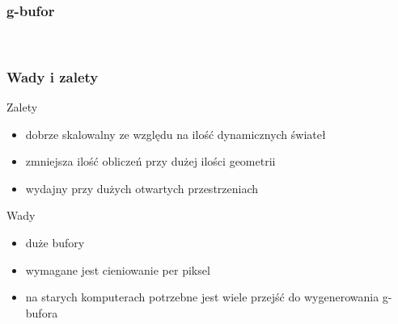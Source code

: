 \documentclass{beamer}
\begin{document}
\frame
{
	\frametitle{g-bufor}

	\begin{figure}
	\centering
	 \hspace{.0\textwidth}
	 \hspace{.0\textwidth} 
	 \hspace{.0\textwidth} \\
	\pause
	\label{fig:deffered_rednering}
	\end{figure}
	\setcounter{subfigure}{0}
}

\frame
{
	\frametitle{Wady i zalety}

	\begin{block}{Zalety}
	\begin{itemize}
		\item dobrze skalowalny ze względu na ilość dynamicznych świateł
		\item zmniejsza ilość obliczeń przy dużej ilości geometrii
		\item wydajny przy dużych otwartych przestrzeniach
	\end{itemize}
	\end{block}
	\begin{block}{Wady}
	\begin{itemize}
		\item duże bufory
		\item wymagane jest cieniowanie per piksel
		\item na starych komputerach potrzebne jest wiele przejść do wygenerowania g-bufora
	\end{itemize}
	\end{block}
}
\end{document}
